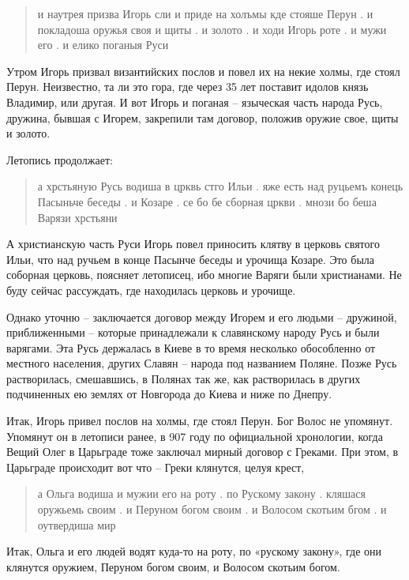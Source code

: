 \begin{quotation}
и наутрея призва Игорь сли и приде на холъмы кде стояше Перун . и покладоша оружья своя и щиты . и золото . и ходи Игорь роте . и мужи его . и елико поганыя Руси
\end{quotation} 

Утром Игорь призвал византийских послов и повел их на некие холмы, где стоял Перун. Неизвестно, та ли это гора, где через 35 лет поставит идолов князь Владимир, или другая. И вот Игорь и поганая – языческая часть народа Русь, дружина, бывшая с Игорем, закрепили там договор, положив оружие свое, щиты и золото. 

Летопись продолжает:

\begin{quotation}
а хрстьяную Русь водиша в црквь стго Ильи . яже есть над руцьемъ  конець Пасыньче  беседы . и Козаре . се бо бе сборная цркви . мнози бо беша Варязи хрстьяни
\end{quotation} 

А христианскую часть Руси Игорь повел приносить клятву в церковь святого Ильи, что над ручьем в конце Пасынче беседы и урочища Козаре. Это была соборная церковь, поясняет летописец, ибо многие Варяги были христианами. Не буду сейчас рассуждать, где находилась церковь и урочище.

Однако уточню – заключается договор между Игорем и его людьми – дружиной, приближенными – которые принадлежали к славянскому народу Русь и были варягами. Эта Русь держалась в Киеве в то время несколько обособленно от местного населения, других Славян – народа под названием Поляне. Позже Русь растворилась, смешавшись, в Полянах так же, как растворилась в других подчиненных ею землях от Новгорода до Киева и ниже по Днепру.

Итак, Игорь привел послов на холмы, где стоял Перун. Бог Волос не упомянут. Упомянут он в летописи ранее, в 907 году по официальной хронологии, когда Вещий Олег в Царьграде тоже заключал мирный договор с Греками. При этом, в Царьграде происходит вот что – Греки клянутся, целуя крест,

\begin{quotation}
а Ольга водиша и мужии его на роту . по Рускому закону . кляшася оружьемь своим . и Перуном богом своим . и Волосом скотьим бгом . и оутвердиша мир
\end{quotation}

Итак, Ольга и его людей водят куда-то на роту, по «рускому закону», где они клянутся оружием, Перуном богом своим, и Волосом скотьим богом.

